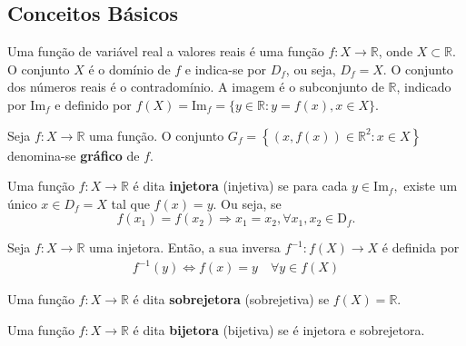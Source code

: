 \subsection*{Conceitos Básicos}
\begin{tcolorbox}

\begin{defi} Uma função de variável real a valores reais é uma função $f:X\longrightarrow \mathbb{R}$, onde $X\subset \mathbb{R}$. O conjunto $X$ é o domínio de $f$ e indica-se por $D_f$, ou seja, $D_f=X$. O conjunto dos números reais é o contradomínio. A imagem é o subconjunto  de $\mathbb{R}$, indicado por $\textrm{Im}_f$ e definido por $f(X)=\textrm{Im}_f=\{y\in\mathbb{R}: y=f(x), x\in X\}$.
\end{defi}

\begin{defi}Seja $f:X\longrightarrow \mathbb{R}$ uma função. O conjunto $G_f=\left\{(x,f(x))\in\mathbb{R}^2: x\in X\right\}$ denomina-se \textbf{gráfico} de $f$.
\end{defi}



\begin{defi}

Uma função $f: X \rightarrow \mathbb{R}$  é dita \textbf{injetora} (injetiva)  se para cada $y\in\mathrm{Im}_f,$ existe um único $x\in D_f=X$ tal que $f(x)=y.$
Ou seja, se $$f(x_1)=f(x_2)\Rightarrow x_1=x_2, \forall x_1, x_2\in\mathrm{D}_f.$$
\end{defi}
%     
\begin{defi}
Seja $f: X \longrightarrow \mathbb{R}$ uma injetora. Então, a sua inversa $f^{-1}: f(X) \longrightarrow X$ é definida por  
\begin{align*}
    f^{-1}(y) \iff f(x)=y \quad  \forall y\in f(X)
\end{align*}
\end{defi}

\begin{defi}
Uma função $f: X \rightarrow \mathbb{R}$ é dita \textbf{sobrejetora} (sobrejetiva) se $f(X)=\mathbb{R}$.
\end{defi}
\begin{defi}
Uma função $f: X \rightarrow \mathbb{R}$ é dita \textbf{bijetora} (bijetiva) se é injetora e sobrejetora.
\end{defi}




\end{tcolorbox}
